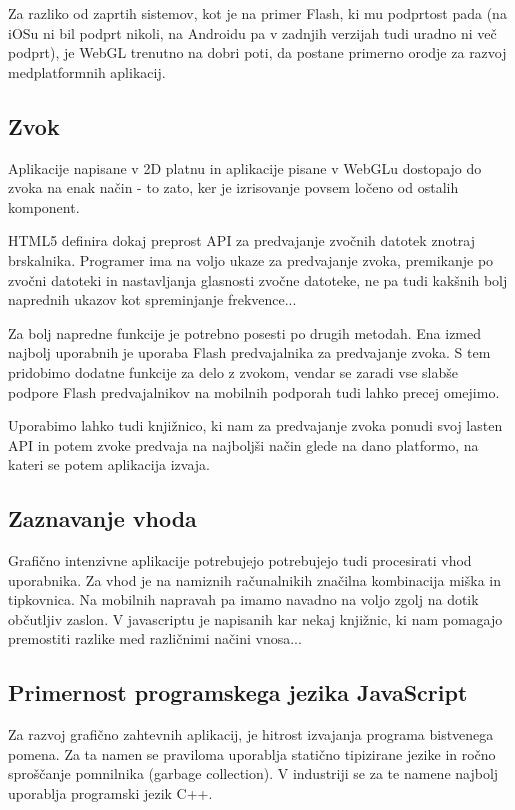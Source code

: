 Za razliko od zaprtih sistemov, kot je na primer Flash, ki mu podprtost pada (na iOSu ni bil podprt nikoli, na Androidu pa v zadnjih verzijah tudi uradno ni več podprt), je WebGL trenutno na dobri poti, da postane primerno orodje za razvoj medplatformnih aplikacij.

\subsection{Zvok}

Aplikacije napisane v 2D platnu in aplikacije pisane v WebGLu dostopajo do zvoka na enak način - to zato, ker je izrisovanje povsem ločeno od ostalih komponent.

HTML5 definira dokaj preprost API za predvajanje zvočnih datotek znotraj brskalnika. Programer ima na voljo ukaze za predvajanje zvoka, premikanje po zvočni datoteki in nastavljanja glasnosti zvočne datoteke, ne pa tudi kakšnih bolj naprednih ukazov kot spreminjanje frekvence...

Za bolj napredne funkcije je potrebno posesti po drugih metodah. Ena izmed najbolj uporabnih je uporaba Flash predvajalnika za predvajanje zvoka. S tem pridobimo dodatne funkcije za delo z zvokom, vendar se zaradi vse slabše podpore Flash predvajalnikov na mobilnih podporah tudi lahko precej omejimo. 

Uporabimo lahko tudi knjižnico, ki nam za predvajanje zvoka ponudi svoj lasten API in potem zvoke predvaja na najboljši način glede na dano platformo, na kateri se potem aplikacija izvaja.

\subsection{Zaznavanje vhoda}

Grafično intenzivne aplikacije potrebujejo potrebujejo tudi procesirati vhod uporabnika. Za vhod je na namiznih računalnikih značilna kombinacija miška in tipkovnica. Na mobilnih napravah pa imamo navadno na voljo zgolj na dotik občutljiv zaslon. V javascriptu je napisanih kar nekaj knjižnic, ki nam pomagajo premostiti razlike med različnimi načini vnosa...

\subsection{Primernost programskega jezika JavaScript}

Za razvoj grafično zahtevnih aplikacij, je hitrost izvajanja programa bistvenega pomena. Za ta namen se praviloma uporablja statično tipizirane jezike in ročno sproščanje pomnilnika (garbage collection). V industriji se za te namene najbolj uporablja programski jezik C++.

